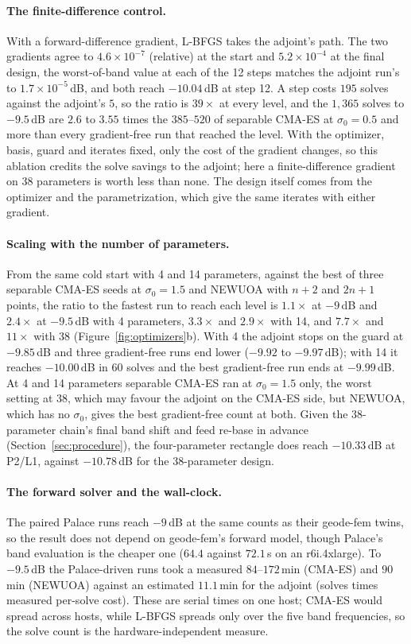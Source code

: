 \documentclass{anvil-paper}
\newcommand{\PL}{P2/L1}
\begin{document}
\paragraph{The finite-difference control.}
With a forward-difference gradient, L-BFGS takes the adjoint's path. The two
gradients agree to $4.6\times10^{-7}$ (relative) at the start and
$5.2\times10^{-4}$ at the final design, the worst-of-band value at each of
the 12 steps matches the adjoint run's to $1.7\times10^{-5}$\,dB, and both
reach $-10.04$\,dB at step 12. A step costs $195$ solves against the
adjoint's $5$, so the ratio is $39\times$ at every level, and the $1{,}365$
solves to $-9.5$\,dB are $2.6$ to $3.55$ times the $385$--$520$ of separable
CMA-ES at $\sigma_0 = 0.5$ and more than every gradient-free run that
reached the level. With the optimizer, basis, guard and iterates fixed, only
the cost of the gradient changes, so this ablation credits the solve savings
to the adjoint; here a finite-difference gradient on 38 parameters is worth less
than none. The design itself comes from the optimizer and the
parametrization, which give the same iterates with either gradient.

\paragraph{Scaling with the number of parameters.}
From the same cold start with 4 and 14 parameters, against the best of three
separable CMA-ES seeds at $\sigma_0 = 1.5$ and NEWUOA with $n + 2$ and
$2n + 1$ points, the ratio to the fastest run to reach each level is
$1.1\times$ at $-9$\,dB and $2.4\times$ at $-9.5$\,dB with 4 parameters,
$3.3\times$ and $2.9\times$ with 14, and $7.7\times$ and $11\times$ with 38 (Figure~\ref{fig:optimizers}b). With 4 the adjoint stops on the guard
at $-9.85$\,dB and three gradient-free runs end lower ($-9.92$ to
$-9.97$\,dB); with 14 it reaches $-10.00$\,dB in $60$ solves and the best
gradient-free run ends at $-9.99$\,dB. At 4 and 14 parameters separable
CMA-ES ran at $\sigma_0 = 1.5$ only, the worst setting at 38, which may
favour the adjoint on the CMA-ES side, but NEWUOA, which has no $\sigma_0$,
gives the best gradient-free count at both. Given the 38-parameter chain's final band
shift and feed re-base in advance (Section~\ref{sec:procedure}), the
four-parameter rectangle does reach $-10.33$\,dB at \PL{}, against
$-10.78$\,dB for the 38-parameter design.

\paragraph{The forward solver and the wall-clock.}
The paired Palace runs reach $-9$\,dB at the same counts as their geode-fem
twins, so the result does not depend on geode-fem's forward model, though
Palace's band evaluation is the cheaper one ($64.4$ against $72.1$\,s on an
r6i.4xlarge). To $-9.5$\,dB the Palace-driven runs took a measured
$84$--$172$\,min (CMA-ES) and $90$\,min (NEWUOA) against an estimated
$11.1$\,min for the adjoint (solves times measured per-solve cost). These
are serial times on one host; CMA-ES would spread across hosts, while L-BFGS
spreads only over the five band frequencies, so the solve count is the
hardware-independent measure.
\end{document}
